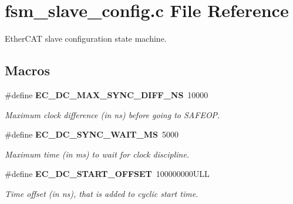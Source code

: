 \section{fsm\-\_\-slave\-\_\-config.\-c File Reference}
\label{fsm__slave__config_8c}


Ether\-C\-A\-T slave configuration state machine.  


\subsection*{Macros}
\begin{DoxyCompactItemize}
\item 
\#define {\bf E\-C\-\_\-\-D\-C\-\_\-\-M\-A\-X\-\_\-\-S\-Y\-N\-C\-\_\-\-D\-I\-F\-F\-\_\-\-N\-S}~10000
\begin{DoxyCompactList}\small\item\em Maximum clock difference (in ns) before going to S\-A\-F\-E\-O\-P. \end{DoxyCompactList}\item 
\#define {\bf E\-C\-\_\-\-D\-C\-\_\-\-S\-Y\-N\-C\-\_\-\-W\-A\-I\-T\-\_\-\-M\-S}~5000\label{fsm__slave__config_8c_aa507b566eace93ee237a040d67a90430}

\begin{DoxyCompactList}\small\item\em Maximum time (in ms) to wait for clock discipline. \end{DoxyCompactList}\item 
\#define {\bf E\-C\-\_\-\-D\-C\-\_\-\-S\-T\-A\-R\-T\-\_\-\-O\-F\-F\-S\-E\-T}~100000000\-U\-L\-L\label{fsm__slave__config_8c_ae3ebe26a0aba621a2fa21a8c216ef4bb}

\begin{DoxyCompactList}\small\item\em Time offset (in ns), that is added to cyclic start time. \end{DoxyCompactList}\end{DoxyCompactItemize}
